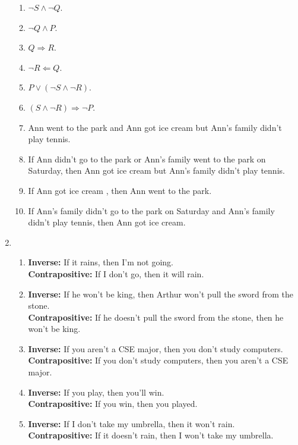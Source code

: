 \documentclass[10pt]{article}
\theoremstyle{plain}
\theoremstyle{definition}
\begin{document}
\begin{enumerate}
\begin{enumerate}
\item $\neg S \wedge \neg Q$. 
\item $\neg Q \wedge P$. 
\item $Q \Rightarrow R$. 
\item $\neg R \Leftarrow Q$. 
\item $P \vee (\neg S \wedge \neg R)$. 
\item $(S \wedge \neg R) \Rightarrow \neg P$. 
\item Ann went to the park and Ann got ice cream but Ann's family didn't play tennis. 
\item If Ann didn't go to the park or Ann's family went to the park on Saturday, then Ann got ice cream but Ann's family didn't play tennis. 
\item If Ann got ice cream , then Ann went to the park. 
\item If Ann's family didn't go to the park on Saturday and Ann's family didn't play tennis, then Ann got ice cream. 



\end{enumerate}

\item 

\begin{enumerate}

\item \textbf{Inverse: } If it rains, then I'm not going. \\
\textbf{Contrapositive: } If I don't go, then it will rain. 


\item \textbf{Inverse: } If he won't be king, then Arthur won't pull the sword from the stone.  \\
\textbf{Contrapositive: } If he doesn't pull the sword from the stone, then he won't be king. 

\item \textbf{Inverse: } If you aren't a CSE major, then you don't study computers. \\
\textbf{Contrapositive: } If you don't study computers, then you aren't a CSE major. 

\item \textbf{Inverse: } If you play, then you'll win. \\
\textbf{Contrapositive: } If you win, then you played. 

\item \textbf{Inverse: } If I don't take my umbrella, then it won't rain.\\
\textbf{Contrapositive: } If it doesn't rain, then I won't take my umbrella.  
\end{enumerate}

\end{enumerate}
\end{document}
